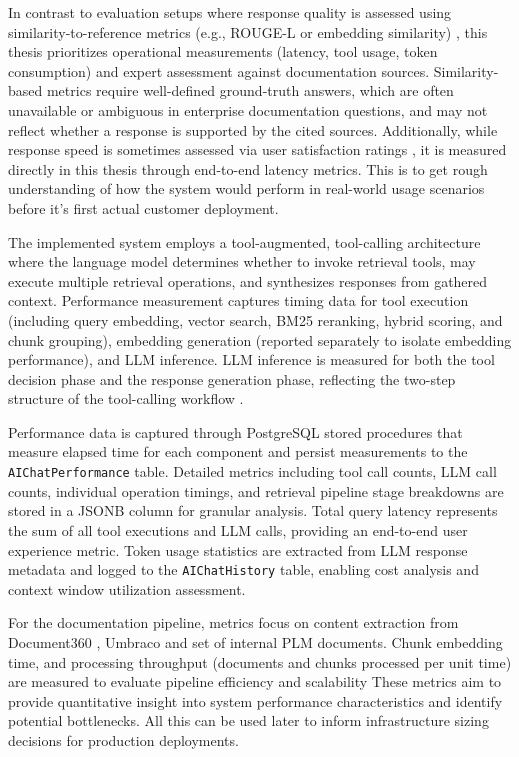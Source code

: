 In contrast to evaluation setups where response quality is assessed using similarity-to-reference metrics (e.g., ROUGE-L or embedding similarity) \parencite{namLoRATunedMultimodalRAG2025}, this thesis prioritizes operational measurements (latency, tool usage, token consumption) and expert assessment against documentation sources. Similarity-based metrics require well-defined ground-truth answers, which are often unavailable or ambiguous in enterprise documentation questions, and may not reflect whether a response is supported by the cited sources. Additionally, while response speed is sometimes assessed via user satisfaction ratings \parencite{namLoRATunedMultimodalRAG2025}, it is measured directly in this thesis through end-to-end latency metrics. This is to get rough understanding of how the system would perform in real-world usage scenarios before it's first actual customer deployment.

The implemented system employs a tool-augmented, tool-calling architecture where the language model determines whether to invoke retrieval tools, may execute multiple retrieval operations, and synthesizes responses from gathered context. Performance measurement captures timing data for tool execution (including query embedding, vector search, BM25 reranking, hybrid scoring, and chunk grouping), embedding generation (reported separately to isolate embedding performance), and LLM inference. LLM inference is measured for both the tool decision phase and the response generation phase, reflecting the two-step structure of the tool-calling workflow \parencite{plaatAgenticLargeLanguage2026}.

Performance data is captured through PostgreSQL stored procedures that measure elapsed time for each component and persist measurements to the \texttt{AIChatPerformance} table. Detailed metrics including tool call counts, LLM call counts, individual operation timings, and retrieval pipeline stage breakdowns are stored in a JSONB column for granular analysis. Total query latency represents the sum of all tool executions and LLM calls, providing an end-to-end user experience metric. Token usage statistics are extracted from LLM response metadata and logged to the \texttt{AIChatHistory} table, enabling cost analysis and context window utilization assessment.

For the documentation pipeline, metrics focus on content extraction from Document360 \parencite{Document360API, SoveliaHelp}, Umbraco \parencite{UmbracoCMSDocumentation2025, ReleaseNewsAll} and set of internal PLM documents. Chunk embedding time, and processing throughput (documents and chunks processed per unit time) are measured to evaluate pipeline efficiency and scalability These metrics aim to provide quantitative insight into system performance characteristics and identify potential bottlenecks. All this can be used later to inform infrastructure sizing decisions for production deployments.

